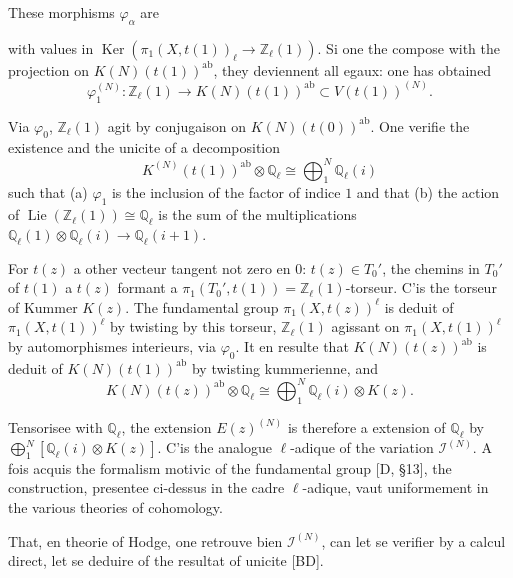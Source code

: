 \documentclass[12pt,a4paper]{article}
\theoremstyle{plain}
\theoremstyle{definition}
\theoremstyle{remark}
\DeclareMathOperator*{\Ker}{Ker}
\DeclareMathOperator{\Lie}{Lie}
\newcommand{\Q}{\mathbb{Q}}
\newcommand{\Z}{\mathbb{Z}}
\newcommand{\ab}{\text{ab}}
\begin{document}
These morphisms $\varphi_\alpha$ are {with values in $\Ker(\pi_1(X,t(1))_\ell\to\Z_\ell(1))$. Si one the compose with the projection on $K(N)(t(1))^{\ab}$, they deviennent all {e}gaux: one has obtained
\begin{equation*}
\varphi_1^{(N)} : \Z_\ell(1) \longrightarrow K(N)(t(1))^{\ab} \subset V(t(1))^{(N)}.
\end{equation*}

Via $\varphi_0$, $\Z_\ell(1)$ agit by conjugaison on $K(N)(t(0))^{\ab}$. One v{e}rifie the existence and the unicit{e} of a d{e}composition
\begin{equation*}
K^{(N)}(t(1))^{\ab}\otimes\Q_\ell \cong \bigoplus_1^N \Q_\ell(i)
\end{equation*}
such that (a) $\varphi_1$ is the inclusion of the factor of indice $1$ and that (b) the action of $\Lie(\Z_\ell(1))\cong\Q_\ell$ is the sum of the multiplications $\Q_\ell(1)\otimes\Q_\ell(i)\to\Q_\ell(i+1)$.

For $t(z)$ a other vecteur tangent not zero en $0$: $t(z)\in T_0'$, the chemins in $T_0'$ of $t(1)$ {a} $t(z)$ formant a $\pi_1(T_0',t(1))=\Z_\ell(1)$-torseur. C'is the torseur of Kummer $K(z)$. The fundamental group $\pi_1(X,t(z))^\ell$ is d{e}duit of $\pi_1(X,t(1))^\ell$ by twisting by this torseur, $\Z_\ell(1)$ agissant on $\pi_1(X,t(1))^\ell$ by automorphismes int{e}rieurs, via $\varphi_0$. It en r{e}sulte that $K(N)(t(z))^{\ab}$ is d{e}duit of $K(N)(t(1))^{\ab}$ by twisting kummerienne, and
\begin{equation*}
K(N)(t(z))^{\ab}\otimes\Q_\ell \cong \bigoplus_1^N \Q_\ell(i) \otimes K(z).
\end{equation*}

Tensoris{e}e with $\Q_\ell$, the extension $E(z)^{(N)}$ is therefore a extension of $\Q_\ell$ by $\bigoplus_1^N[\Q_\ell(i)\otimes K(z)]$. C'is the analogue $\ell$-adique of the variation $\mathcal{I}^{(N)}$. A fois acquis the formalism motivic of the fundamental group [D, \S 13], the construction, pr{e}sent{e}e ci-dessus in the cadre $\ell$-adique, vaut uniform{e}ment in the various th{e}ories of cohomology.

That, en th{e}orie of Hodge, one retrouve bien $\mathcal{I}^{(N)}$, can let se v{e}rifier by a calcul direct, let se d{e}duire of the r{e}sultat of unicit{e} [BD].

\subsection{}

}
\end{document}
